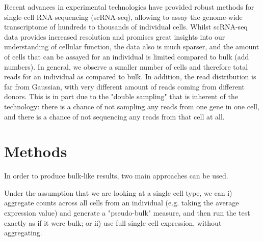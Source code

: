Recent advances in experimental technologies have provided robust methods for single-cell RNA sequencing (scRNA-seq), allowing to assay the genome-wide transcriptome of hundreds to thousands of individual cells. 
Whilst scRNA-seq data provides increased resolution and promises great insights into our understanding of cellular function, the data also is much sparser, and the amount of cells that can be assayed for an individual is limited compared to bulk (add numbers).
In general, we observe a smaller number of cells and therefore total reads for an individual as compared to bulk. 
In addition, the read distribution is far from Gaussian, with very different amount of reads coming from different donors. 
This is in part due to the "double sampling" that is inherent of the technology: there is a chance of not sampling any reads from one gene in one cell, and there is a chance of not sequencing any reads from that cell at all.


\section{Methods}

In order to produce bulk-like results, two main approaches can be used.

Under the assumption that we are looking at a single cell type, we can i) aggregate counts across all cells from an individual (e.g. taking the average expression value) and generate a "pseudo-bulk" measure, and then run the test exactly as if it were bulk; or ii) use full single cell expression, without aggregating.


